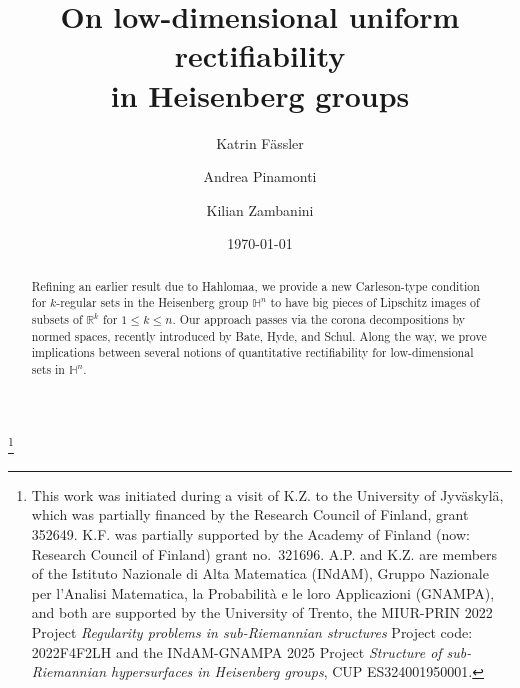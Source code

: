 \documentclass[12pt]{amsart}
\numberwithin{equation}{section}
\theoremstyle{plain}
\theoremstyle{definition}
\theoremstyle{remark}
\begin{document}
\title[Uniform rectifiability in Heisenberg groups]
{On low-dimensional uniform rectifiability\\ in Heisenberg groups 
}
\author{Katrin Fässler}
\address{Department of Mathematics and Statistics\\ University of Jyv\"askyl\"a \\ P.O. Box 35 (MaD),
FI-40014 University of Jyv\"askyl\"a, Finland}


\author{Andrea Pinamonti}
\address{Dipartimento di Matematica, Università di Trento\\
Via Sommarive, 14, 38123 Povo TN, Italy}

\author{Kilian Zambanini}
\address{Dipartimento di Matematica, Università di Trento\\
Via Sommarive, 14, 38123 Povo TN, Italy}

\thanks{This work was initiated during a visit of K.Z. to the University of Jyväskylä, which was partially financed by the Research Council of Finland, grant 
352649. K.F. was partially supported by the Academy of Finland (now: Research Council of Finland)
grant no.\ 321696. A.P. and K.Z. are members of the Istituto Nazionale di Alta Matematica (INdAM), Gruppo Nazionale per l'Analisi Matematica, la Probabilità e le loro Applicazioni (GNAMPA), and both are supported by the University of Trento, the MIUR-PRIN 2022 Project \emph{Regularity problems in sub-Riemannian structures}  Project code: 2022F4F2LH and the INdAM-GNAMPA 2025 Project \emph{Structure of sub-Riemannian hypersurfaces in Heisenberg groups}, CUP ES324001950001.}

\date{\today}



\begin{abstract} Refining an earlier result due to Hahlomaa, we provide a new Carleson-type condition for $k$-regular sets in the Heisenberg group $\mathbb{H}^n$ to have big pieces of Lipschitz images of subsets of $\mathbb{R}^k$ for $1\leq k\leq n$. Our approach passes via the corona decompositions by normed spaces, recently introduced by Bate, Hyde, and Schul. Along the way, we prove implications between several notions of quantitative rectifiability for low-dimensional sets in $\mathbb{H}^n$.
\end{abstract}
\maketitle
\end{document}
